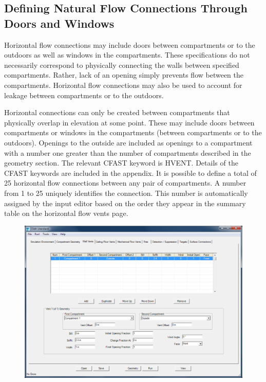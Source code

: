 \subsection{Defining Natural Flow Connections Through Doors and Windows}

Horizontal flow connections may include doors between compartments or to the outdoors as well as windows in the compartments.  These specifications do not necessarily correspond to physically connecting the walls between specified compartments.  Rather, lack of an opening simply prevents flow between the compartments.  Horizontal flow connections may also be used to account for leakage between compartments or to the outdoors. 

Horizontal connections can only be created between compartments that physically overlap in elevation at some point. These may include doors between compartments or windows in the compartments (between compartments or to the outdoors).  Openings to the outside are included as openings to a compartment with a number one greater than the number of compartments described in the geometry section.  The relevant CFAST keyword is HVENT.  Details of the CFAST keywords are included in the appendix. It is possible to define a total of 25 horizontal flow connections between any pair of compartments. A number from 1 to 25 uniquely identifies the connection. This number is automatically assigned by the input editor based on the order they appear in the summary table on the horizontal flow vents page.

\begin{figure}[h!]
\includegraphics[width=6.5in]{FIGURES/Input_File/Natural_Flow_Tab}
\end{figure}

